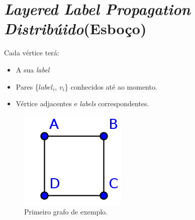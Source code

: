 \documentclass[a4paper,10pt]{report}
\title{}
\author{}
\begin{document}
\section*{\textit{Layered Label Propagation Distribúido}(Esboço)}

Cada vértice terá:
\begin{itemize}
  \item A sua \textit{label}
  \item Pares \{$label_i$, $v_i$\} conhecidos até ao momento.
  \item Vértice adjacentes e \textit{labels} correspondentes.
\end{itemize}

\begin{figure}[h]
\center
\includegraphics{graph_distributed_example1}
\caption{Primeiro grafo de exemplo.\label{fig:distributedexample1}}
\end{figure}
\end{document}
